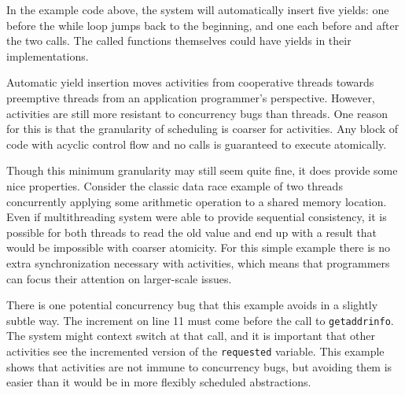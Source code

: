 \documentclass[9pt,preprint]{sigplanconf-2}
\begin{document}
In the example code above, the system will automatically insert five yields: one before the while loop jumps back to the beginning, and one each before and after the two calls.
The called functions themselves could have yields in their implementations.

Automatic yield insertion moves activities from cooperative threads towards preemptive threads from an application programmer's perspective.
However, activities are still more resistant to concurrency bugs than threads.
One reason for this is that the granularity of scheduling is coarser for activities.
Any block of code with acyclic control flow and no calls is guaranteed to execute atomically.

Though this minimum granularity may still seem quite fine, it does provide some nice properties.
Consider the classic data race example of two threads concurrently applying some arithmetic operation to a shared memory location.
Even if multithreading system were able to provide sequential consistency, it is possible for both threads to read the old value and end up with a result that would be impossible with coarser atomicity.
For this simple example there is no extra synchronization necessary with activities, which means that programmers can focus their attention on larger-scale issues.

There is one potential concurrency bug that this example avoids in a slightly subtle way.
The increment on line 11 must come before the call to \texttt{getaddrinfo}.
The system might context switch at that call, and it is important that other activities see the incremented version of the \texttt{requested} variable.
This example shows that activities are not immune to concurrency bugs, but avoiding them is easier than it would be in more flexibly scheduled abstractions.





\end{document}
